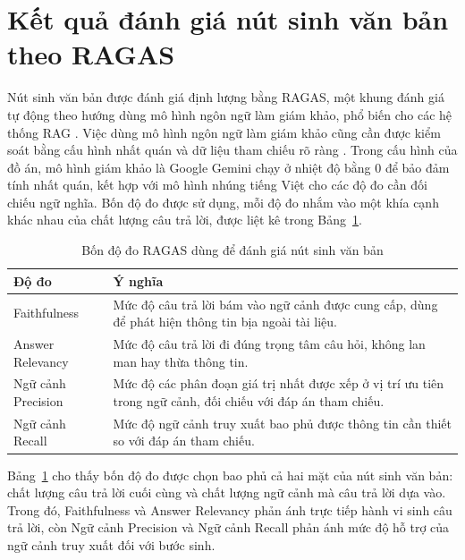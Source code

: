 \documentclass[../DoAn.tex]{subfiles}
\begin{document}
\section{Kết quả đánh giá nút sinh văn bản theo RAGAS}
\label{sec:result-generate}

Nút sinh văn bản được đánh giá định lượng bằng RAGAS, một khung đánh giá tự động theo hướng dùng mô hình ngôn ngữ làm giám khảo, phổ biến cho các hệ thống RAG \cite{es2023ragas}. Việc dùng mô hình ngôn ngữ làm giám khảo cũng cần được kiểm soát bằng cấu hình nhất quán và dữ liệu tham chiếu rõ ràng \cite{zheng2023llmjudge}. Trong cấu hình của đồ án, mô hình giám khảo là Google Gemini chạy ở nhiệt độ bằng 0 để bảo đảm tính nhất quán, kết hợp với mô hình nhúng tiếng Việt cho các độ đo cần đối chiếu ngữ nghĩa. Bốn độ đo được sử dụng, mỗi độ đo nhắm vào một khía cạnh khác nhau của chất lượng câu trả lời, được liệt kê trong Bảng~\ref{tab:ragas-metrics}.

\begin{table}[H]
    \centering
    \renewcommand{\arraystretch}{1.3}
    \begin{tabular}{|p{}|p{}|}
        \hline
        \textbf{Độ đo} & \textbf{Ý nghĩa} \\
        \hline
        Faithfulness & Mức độ câu trả lời bám vào ngữ cảnh được cung cấp, dùng để phát hiện thông tin bịa ngoài tài liệu. \\
        \hline
        Answer Relevancy & Mức độ câu trả lời đi đúng trọng tâm câu hỏi, không lan man hay thừa thông tin. \\
        \hline
        Ngữ cảnh Precision & Mức độ các phân đoạn giá trị nhất được xếp ở vị trí ưu tiên trong ngữ cảnh, đối chiếu với đáp án tham chiếu. \\
        \hline
        Ngữ cảnh Recall & Mức độ ngữ cảnh truy xuất bao phủ được thông tin cần thiết so với đáp án tham chiếu. \\
        \hline
    \end{tabular}
    \vspace{0.2cm}
\caption{Bốn độ đo RAGAS dùng để đánh giá nút sinh văn bản}
    \label{tab:ragas-metrics}
\end{table}

Bảng~\ref{tab:ragas-metrics} cho thấy bốn độ đo được chọn bao phủ cả hai mặt của nút sinh văn bản: chất lượng câu trả lời cuối cùng và chất lượng ngữ cảnh mà câu trả lời dựa vào. Trong đó, Faithfulness và Answer Relevancy phản ánh trực tiếp hành vi sinh câu trả lời, còn Ngữ cảnh Precision và Ngữ cảnh Recall phản ánh mức độ hỗ trợ của ngữ cảnh truy xuất đối với bước sinh.
\end{document}
